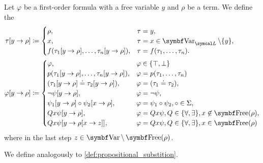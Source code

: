 \begin{definition}\label{def:first_order_substition}
  Let \( \varphi \) be a first-order formula with a free variable \( y \) and \( \rho \) be a term. We define the 
  \begin{align*}
    \tau[y \to \rho] &\coloneqq \begin{cases}
      \rho,                                              &\tau = y, \\
      x,                                                 &\tau = x \in \Bold{Var}_{\Cal{L}} \setminus \{ y \}, \\
      f(\tau_1[y \to \rho], \ldots, \tau_n[y \to \rho]), &\tau = f(\tau_1, \ldots, \tau_n).
    \end{cases}
    \\
    \varphi[y \to \rho] &\coloneqq \begin{cases}
      \varphi,                                           &\varphi \in \{ \top, \bot \} \\
      p(\tau_1[y \to \rho], \ldots, \tau_n[y \to \rho]), &\varphi = p(\tau_1, \ldots, \tau_n) \\
      (\tau_1[y \to \rho] \doteq \tau_2[y \to \rho]),    &\varphi = (\tau_1 \doteq \tau_2), \\
      \neg \psi[y \to \rho],                             &\varphi = \neg \psi, \\
      \psi_1[y \to \rho] \circ \psi_2[x \to \rho],       &\varphi = \psi_1 \circ \psi_2, \circ \in \Sigma, \\
      Q x \psi[y \to \rho],                              &\varphi = Q x \psi, Q \in \{ \forall, \exists \}, x \not\in \Bold{Free}(\rho), \\
      Q x \psi[y \to \rho[x \to z]],                     &\varphi = Q x \psi, Q \in \{ \forall, \exists \}, x \in \Bold{Free}(\rho)
    \end{cases}
  \end{align*}
  where in the last step \( z \in \Bold{Var} \setminus \Bold{Free}(\rho) \).

  We define  analogously to \cref{def:propositional_substition}.
\end{definition}

